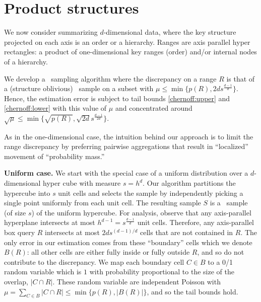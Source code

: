 \documentclass[11pt]{article}
\begin{document}
\section{Product structures} \label{product:sec}

We now consider summarizing $d$-dimensional data, where the key structure
 projected on each axis is an order or a hierarchy. 
Ranges are axis parallel hyper rectangles: a product of one-dimensional 
key ranges (order) and/or internal nodes of a hierarchy.


We develop a \varopt\ sampling algorithm where 
the discrepancy on a range $R$ is
that of a (structure oblivious) \varopt\ sample on a subset with 
$\mu\leq \min\{p(R),2ds^{\frac{d-1}{d}}\}$.  
Hence, the estimation error is subject to tail bounds \eqref{chernoff:upper} and \eqref{chernoff:lower} with this value of $\mu$ and 
concentrated around 
$\sqrt{\mu}\leq \min\{\sqrt{p(R)},\sqrt{2d}s^{\frac{d-1}{2d}}\}$.   


As in the one-dimensional case, 
the intuition behind our approach is to limit the range discrepancy 
by preferring pairwise aggregations that result in ``localized'' 
movement of ``probability mass.''     

\medskip
\noindent
{\bf Uniform case.}
We start with the special case of a 
uniform distribution over a $d$-dimensional hyper cube with measure $s=h^d$.
Our algorithm partitions the hypercube into $s$ unit cells and 
selects the sample by independently picking 
a single point uniformly from each unit cell. 
The resulting sample $S$ is a \varopt\ sample (of size $s$) of the
uniform hypercube. 
 For analysis, observe that any  axis-parallel hyperplane intersects at most 
$h^{d-1}=s^{\frac{d-1}{d}}$ unit cells.
Therefore, 
any axis-parallel box query $R$ intersects at most 
$2d s^{(d-1)/d}$ cells that are not contained in $R$. 
The only error in our estimation comes from these 
``boundary'' cells which we denote $B(R)$:
all other cells are either fully inside or fully outside $R$, and so
do not contribute to the discrepancy. 
We map each boundary cell $C\in B$ to a 0/1 random variable which is $1$
with probability proportional to the size of the overlap, $|C\cap R|$.  
These random variable are independent Poisson 
with $\mu=\sum_{C\in B} |C\cap R| \leq \min\{p(R),|B(R)|\}$, and so
the tail bounds hold.
\end{document}

